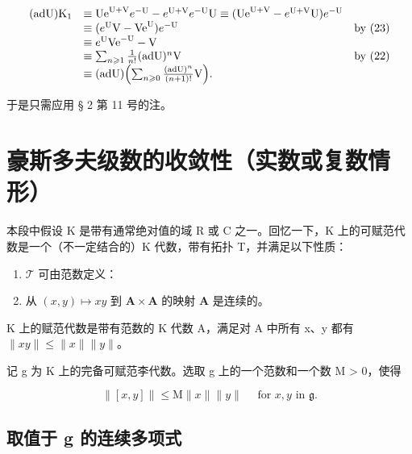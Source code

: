 \[
\begin{array}{r l r} (\mathrm{adU}) \mathrm{K} _ {1} & \equiv \mathrm{Ue} ^ {\mathrm{U} + \mathrm{V}} e ^ {- \mathrm{U}} - e ^ {\mathrm{U} + \mathrm{V}} e ^ {- \mathrm{U}} \mathrm{U} \equiv (\mathrm{Ue} ^ {\mathrm{U} + \mathrm{V}} - e ^ {\mathrm{U} + \mathrm{V}} \mathrm{U}) e ^ {- \mathrm{U}} \\ & \equiv (e ^ {\mathrm{U}} \mathrm{V} - \mathrm{Ve} ^ {\mathrm{U}}) e ^ {- \mathrm{U}} & \text {by (23)} \\ & \equiv e ^ {\mathrm{U}} \mathrm{Ve} ^ {- \mathrm{U}} - \mathrm{V} \\ & \equiv \sum_ {n \geqslant 1} \frac {1}{n !} (\mathrm{adU}) ^ {n} \mathrm{V} & \text {by (22)} \\ & \equiv (\mathrm{adU}) \Bigl (\sum_ {n \geqslant 0} \frac {(\mathrm{adU}) ^ {n}}{(n + 1) !} \mathrm{V} \Bigr). \end{array}
\]

于是只需应用 § 2 第 11 号的注。

\section{豪斯多夫级数的收敛性（实数或复数情形）}

本段中假设 K 是带有通常绝对值的域 R 或 C 之一。回忆一下，K 上的可赋范代数是一个（不一定结合的）K 代数，带有拓扑 T，并满足以下性质：

\begin{enumerate}
\def\labelenumi{(\arabic{enumi})}
\item
  \(\mathcal{T}\) 可由范数定义：
\item
  从 \((x,y)\mapsto xy\) 到 \(\mathbf{A}\times \mathbf{A}\) 的映射 \(\mathbf{A}\) 是连续的。
\end{enumerate}

K 上的赋范代数是带有范数的 K 代数 A，满足对 A 中所有 x、y 都有 \(\|xy\|\leqslant\|x\|\|y\|\)。

记 g 为 K 上的完备可赋范李代数。选取 g 上的一个范数和一个数 M > 0，使得

\[
\| [ x, y ] \| \leqslant \mathrm{M} \| x \| \| y \| \quad \text { for } x, y \text { in } \mathfrak {g}.\tag{1}
\]

\subsection{取值于 g 的连续多项式}

